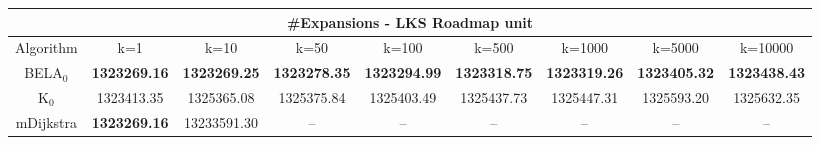 \begin{tabular}{c|cccccccc}\toprule
\multicolumn{9}{c}{#Expansions - LKS Roadmap unit}\\ \midrule
Algorithm & k=1 & k=10 & k=50 & k=100 & k=500 & k=1000 & k=5000 & k=10000 \\ \midrule
BELA$_0$ & \textbf{1323269.16} & \textbf{1323269.25} & \textbf{1323278.35} & \textbf{1323294.99} & \textbf{1323318.75} & \textbf{1323319.26} & \textbf{1323405.32} & \textbf{1323438.43} \\
K$_0$ & 1323413.35 & 1325365.08 & 1325375.84 & 1325403.49 & 1325437.73 & 1325447.31 & 1325593.20 & 1325632.35 \\
mDijkstra & \textbf{1323269.16} & 13233591.30 & -- & -- & -- & -- & -- & -- \\ \bottomrule 
\end{tabular}
